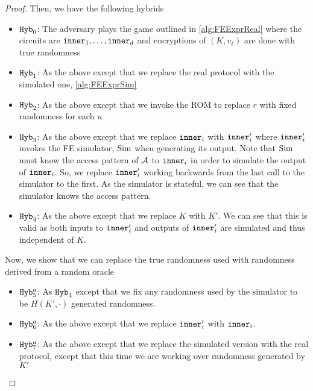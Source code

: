 \begin{lemma}
\begin{proof}
		Then, we have the following hybrids
		\begin{itemize}
			\item $\texttt{Hyb}_0$: The adversary plays the game outlined in \cref{alg:FEExprReal} where the circuits are $\texttt{inner}_1, \dots, \texttt{inner}_d$
			and encryptions of $(K, v_\ell)$ are done with true randomness
			\item $\texttt{Hyb}_1$: As the above except that we replace the real protocol with the simulated one, \cref{alg:FEExprSim}
			\item $\texttt{Hyb}_2$: As the above except that we invoke the ROM to replace $r$ with fixed randomness for each $u$
			\item $\texttt{Hyb}_3$: As the above except that we replace $\texttt{inner}_i$ with $\texttt{inner}_i'$ where $\texttt{inner}_i'$ invokes the FE simulator, $\text{Sim}$ when generating its output.
			Note that $\text{Sim}$ must know the access pattern of $\mathcal{A}$ to $\texttt{inner}_i$ in order to simulate the output of $\texttt{inner}_i$.
			So, we replace $\texttt{inner}_i'$ working backwards from the last call to the simulator to the first.
			As the simulator is stateful, we can see that the simulator knows the access pattern.
			\item $\texttt{Hyb}_4$: As the above except that we replace $K$ with $K'$.
			We can see that this is valid as both inputs to $\texttt{inner}'_i$ and outputs of $\texttt{inner}'_i$ are simulated and thus independent of $K$.
		\end{itemize}
	Now, we show that we can replace the true randomness used with randomness derived from a random oracle%
	\begin{itemize}
		\item $\texttt{Hyb}_5^a$: As $\texttt{Hyb}_4$ except that we fix any randomness used by the simulator to be $H(K', \cdot)$ generated randomness.
		\item $\texttt{Hyb}_6^a$: As the above except that we replace $\texttt{inner}'_i$ with $\texttt{inner}_i$.
		\item $\texttt{Hyb}_7^a$: As the above except that we replace the simulated version with the real protocol, except that this time we are working over randomness generated by $K'$

\end{itemize}
\end{proof}
\end{lemma}
